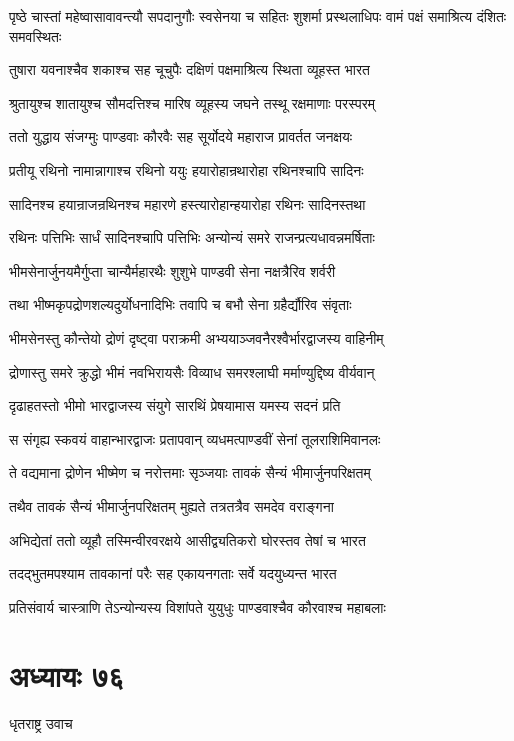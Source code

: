 \threelineshloka
{पृष्ठे चास्तां महेष्वासावावन्त्यौ सपदानुगौः}
{स्वसेनया च सहितः शुशर्मा प्रस्थलाधिपः}
{वामं पक्षं समाश्रित्य दंशितः समवस्थितः}


\twolineshloka
{तुषारा यवनाश्चैव शकाश्च सह चूचुपैः}
{दक्षिणं पक्षमाश्रित्य स्थिता व्यूहस्त भारत}


\twolineshloka
{श्रुतायुश्च शातायुश्च सौमदत्तिश्च मारिष}
{व्यूहस्य जघने तस्थू रक्षमाणाः परस्परम्}


\twolineshloka
{ततो युद्धाय संजग्मुः पाण्डवाः कौरवैः सह}
{सूर्योदये महाराज प्रावर्तत जनक्षयः}


\twolineshloka
{प्रतीयू रथिनो नामान्नागाश्च रथिनो ययुः}
{हयारोहान्रथारोहा रथिनश्चापि सादिनः}


\twolineshloka
{सादिनश्च हयान्राजन्रथिनश्च महारणे}
{हस्त्यारोहान्हयारोहा रथिनः सादिनस्तथा}


\twolineshloka
{रथिनः पत्तिभिः सार्धं सादिनश्चापि पत्तिभिः}
{अन्योन्यं समरे राजन्प्रत्यधावन्नमर्षिताः}


\twolineshloka
{भीमसेनार्जुनयमैर्गुप्ता चान्यैर्महारथैः}
{शुशुभे पाण्डवी सेना नक्षत्रैरिव शर्वरी}


\twolineshloka
{तथा भीष्मकृपद्रोणशल्यदुर्योधनादिभिः}
{तवापि च बभौ सेना ग्रहैर्द्यौरिव संवृताः}


\twolineshloka
{भीमसेनस्तु कौन्तेयो द्रोणं दृष्ट्वा पराक्रमी}
{अभ्ययाञ्जवनैरश्वैर्भारद्वाजस्य वाहिनीम्}


\twolineshloka
{द्रोणास्तु समरे क्रुद्धो भीमं नवभिरायसैः}
{विव्याध समरश्लाघी मर्माण्युद्दिष्य वीर्यवान्}


\twolineshloka
{दृढाहतस्तो भीमो भारद्वाजस्य संयुगे}
{सारथिं प्रेषयामास यमस्य सदनं प्रति}


\twolineshloka
{स संगृह्य स्कवयं वाहान्भारद्वाजः प्रतापवान्}
{व्यधमत्पाण्डवीं सेनां तूलराशिमिवानलः}


\twolineshloka
{ते वद्यमाना द्रोणेन भीष्मेण च नरोत्तमाः}
{सृञ्जयाः तावकं सैन्यं भीमार्जुनपरिक्षतम्}


\twolineshloka
{तथैव तावकं सैन्यं भीमार्जुनपरिक्षतम्}
{मुह्यते तत्रतत्रैव समदेव वराङ्गना}


\twolineshloka
{अभिद्येतां ततो व्यूहौ तस्मिन्वीरवरक्षये}
{आसीद्व्यतिकरो घोरस्तव तेषां च भारत}


\twolineshloka
{तदद्भुतमपश्याम तावकानां परैः सह}
{एकायनगताः सर्वे यदयुध्यन्त भारत}


\twolineshloka
{प्रतिसंवार्य चास्त्राणि तेऽन्योन्यस्य विशांपते}
{युयुधुः पाण्डवाश्चैव कौरवाश्च महाबलाः}


\chapter{अध्यायः ७६}
\twolineshloka
{धृतराष्ट्र उवाच}
{}


